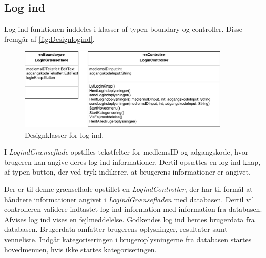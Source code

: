 \subsection*{Log ind}
Log ind funktionen inddeles i klasser af typen boundary og controller. Disse fremgår af \autoref{fig:Designlogind}. 

\begin{figure} [H]
\centering
\includegraphics[width=0.9\textwidth]{figures/MVC/MVCLogInd}
\caption{Designklasser for log ind.}
\label{fig:Designlogind}
\end{figure}

\noindent
I \textit{LogindGrænseflade} opstilles tekstfelter for medlemsID og adgangskode, hvor brugeren kan angive deres log ind informationer. Dertil opsættes en log ind knap, af typen button, der ved tryk indikerer, at brugerens informationer er angivet. 

Der er til denne grænseflade opstillet en \textit{LogindController}, der har til formål at håndtere informationer angivet i \textit{LogindGrænsefladen} med databasen. Dertil vil controlleren validere indtastet log ind information med information fra databasen. Afvises log ind vises en fejlmeddelelse. Godkendes log ind hentes brugerdata fra databasen. Brugerdata omfatter brugerens oplysninger, resultater samt venneliste. Indgår kategoriseringen i brugeroplysningerne fra databasen startes hovedmenuen, hvis ikke startes kategoriseringen. 
